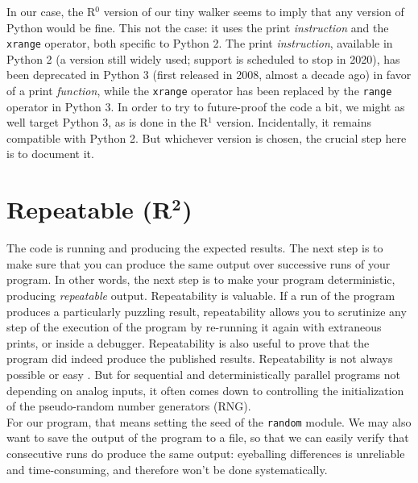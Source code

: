\documentclass[a4paper,11pt]{article}
\begin{document}
In our case, the R$^0$ version of our tiny walker seems to imply that any version of Python would be fine. This not the case: it uses the print {\em instruction} and the {\tt xrange} operator, both specific to Python 2. The print {\em instruction}, available in Python 2 (a version still widely used; support is scheduled to stop in 2020), has been deprecated in Python 3 (first released in 2008, almost a decade ago) in favor of a print {\em function}, while the {\tt xrange} operator has been replaced by the {\tt range} operator in Python 3. In order to try to future-proof the code a bit, we might as well target Python 3, as is done in the R$^1$ version. Incidentally, it remains compatible with Python 2. But whichever version is chosen, the crucial step here is to document it.


\section*{Repeatable (R$^{\mathbf 2}$)}

The code is running and producing the expected results. The next step is to make sure that you can produce the same output over successive runs of your program. In other words, the next step is to make your program deterministic, producing {\em repeatable} output.  Repeatability is valuable. If a run of the program produces a particularly puzzling result, repeatability allows you to scrutinize any step of the execution of the program by re-running it again with extraneous prints, or inside a debugger. Repeatability is also useful to prove that the program did indeed produce the published results. Repeatability is not always possible or easy \citep{Diethelm:2012, Courtes:2015}. But for sequential and deterministically parallel programs \citep{Hines:2008, Collange:2015} not depending on analog inputs, it often comes down to controlling the initialization of the pseudo-random number generators (RNG).\\

For our program, that means setting the seed of the {\tt random} module. We may also want to save the output of the program to a file, so that we can easily verify that consecutive runs do produce the same output: eyeballing differences is unreliable and  time-consuming, and therefore won't be done systematically.\\
\end{document}
